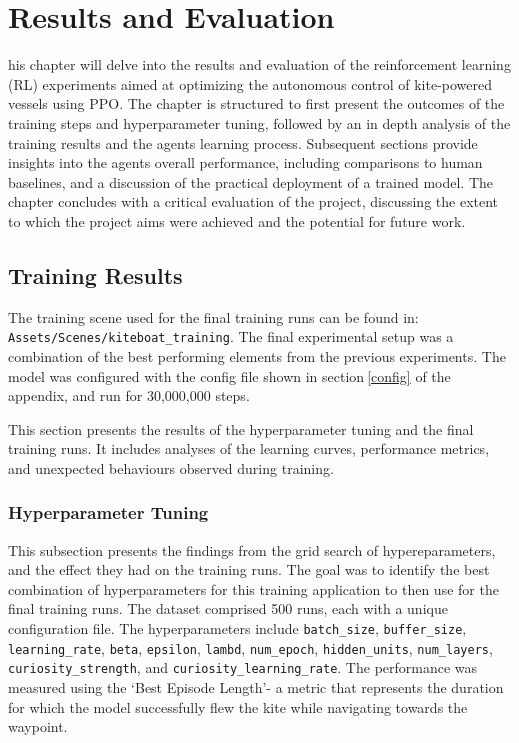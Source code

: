 

\let\textcircled=\pgftextcircled\chapter{Results and Evaluation}\label{chap:results}

his chapter will delve into the results and evaluation of the reinforcement learning (RL) experiments aimed at optimizing the autonomous control of kite-powered vessels using PPO. The chapter is structured to first present the outcomes of the training steps and hyperparameter tuning, followed by an in depth analysis of the training results and the agents learning process. Subsequent sections provide insights into the agents overall performance, including comparisons to human baselines, and a discussion of the practical deployment of a trained model. The chapter concludes with a critical evaluation of the project, discussing the extent to which the project aims were achieved and the potential for future work.


\section{Training Results}

The training scene used for the final training runs can be found in:
\newline
\texttt{Assets/Scenes/kiteboat\_training}. 
The final experimental setup was a combination of the best performing elements from the previous experiments. The model was configured with the config file shown in section$~$\ref{config} of the appendix, and run for 30,000,000 steps.

This section presents the results of the hyperparameter tuning and the final training runs. It includes analyses of the learning curves, performance metrics, and unexpected behaviours observed during training.

\subsection{Hyperparameter Tuning}\label{sec:hyperparameter_tuning}

This subsection presents the findings from the grid search of hypereparameters, and the effect they had on the training runs. The goal was to identify the best combination of hyperparameters for this training application to then use for the final training runs. The dataset comprised 500 runs, each with a unique configuration file. The hyperparameters include \texttt{batch\_size}, \texttt{buffer\_size}, \texttt{learning\_rate}, \texttt{beta}, \texttt{epsilon}, \texttt{lambd}, \texttt{num\_epoch}, \texttt{hidden\_units}, \texttt{num\_layers}, \texttt{curiosity\_strength}, and \texttt{curiosity\_learning\_rate}. The performance was measured using the `Best Episode Length'- a metric that represents the duration for which the model successfully flew the kite while navigating towards the waypoint. 

